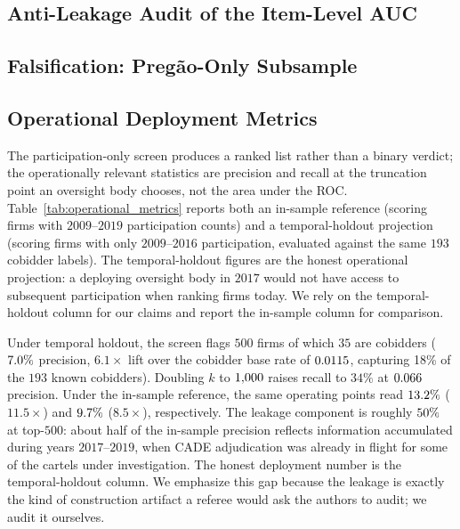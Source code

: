 

\subsection{Anti-Leakage Audit of the Item-Level AUC}



\subsection{Falsification: Pregão-Only Subsample}



\subsection{Operational Deployment Metrics}

The participation-only screen produces a ranked list rather
than a binary verdict; the operationally relevant statistics
are precision and recall at the truncation point an oversight
body chooses, not the area under the ROC. Table~\ref{tab:operational_metrics}
reports both an in-sample reference (scoring firms with
$2009$--$2019$ participation counts) and a temporal-holdout
projection (scoring firms with only $2009$--$2016$
participation, evaluated against the same $193$ cobidder
labels). The temporal-holdout figures are the honest
operational projection: a deploying oversight body in $2017$
would not have access to subsequent participation when
ranking firms today. We rely on the temporal-holdout column
for our claims and report the in-sample column for
comparison.

Under temporal holdout, the screen flags $500$ firms of which
$35$ are cobidders ($7.0\%$ precision, $6.1\!\!\times$ lift over
the cobidder base rate of $0.0115$, capturing 18\% of the
$193$ known cobidders). Doubling $k$ to $1{,}000$ raises recall
to $34\%$ at $0.066$ precision. Under the in-sample reference,
the same operating points read $13.2\%$ ($11.5\!\!\times$) and
$9.7\%$ ($8.5\!\!\times$), respectively. The leakage component
is roughly $50\%$ at top-$500$: about half of the in-sample
precision reflects information accumulated during years
$2017$--$2019$, when CADE adjudication was already in flight
for some of the cartels under investigation. The honest
deployment number is the temporal-holdout column. We emphasize
this gap because the leakage is exactly the kind of
construction artifact a referee would ask the authors to
audit; we audit it ourselves.

